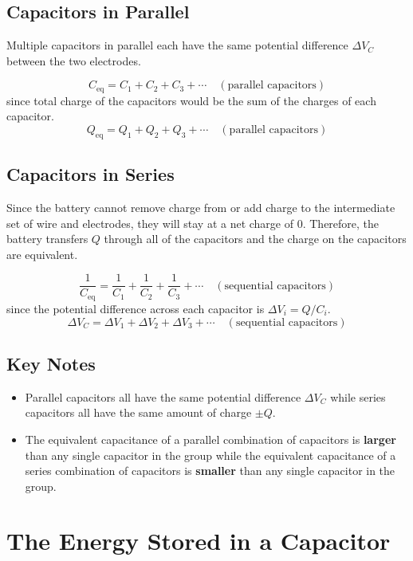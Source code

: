 \documentclass{article}
\begin{document}
\subsection*{Capacitors in Parallel}

Multiple capacitors in parallel each have the same potential difference $\Delta V_C$ between the
two electrodes.

\[C_\text{eq}=C_1 + C_2 + C_3 + \cdots\quad (\text{parallel capacitors})\]
since total charge of the capacitors would be the sum of the charges of each capacitor.
\[Q_\text{eq}=Q_1 + Q_2 + Q_3 + \cdots\quad (\text{parallel capacitors})\]

\subsection*{Capacitors in Series}

Since the battery cannot remove charge from or add charge to the intermediate set of wire and
electrodes, they will stay at a net charge of 0. Therefore, the battery transfers $Q$ through all
of the capacitors and the charge on the capacitors are equivalent.

\[\frac{1}{C_\text{eq}}=\frac{1}{C_1} + \frac{1}{C_2} + \frac{1}{C_3} + \cdots\quad (\text{sequential capacitors})\]
since the potential difference across each capacitor is $\Delta V_i = Q/C_i$.
\[\Delta V_C=\Delta V_1 + \Delta V_2 + \Delta V_3 + \cdots\quad (\text{sequential capacitors})\]

\subsection*{Key Notes}
\begin{itemize}
    \item Parallel capacitors all have the same potential difference $\Delta V_C$ while series
    capacitors all have the same amount of charge $\pm Q$.
    \item The equivalent capacitance of a parallel combination of capacitors is \textbf{larger}
    than any single capacitor in the group while the equivalent capacitance of a series combination
    of capacitors is \textbf{smaller} than any single capacitor in the group.
\end{itemize}

\section*{The Energy Stored in a Capacitor}
\end{document}
